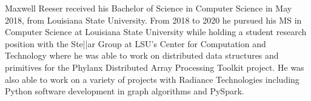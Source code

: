 \label{chap:vita}
Maxwell Reeser received his Bachelor of Science in Computer Science in May 2018, from Louisiana State University. From 2018 to 2020 he pursued his MS in Computer Science at Louisiana State University while holding a student research position with the Ste||ar Group at LSU's Center for Computation and Technology where he was able to work on distributed data structures and primitives for the Phylanx Distributed Array Processing Toolkit project. He was also able to work on a variety of projects with Radiance Technologies including Python software development in graph algorithms and PySpark.



